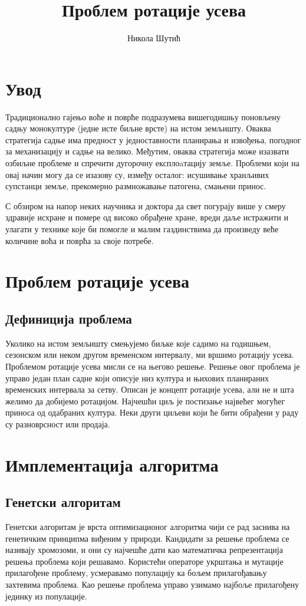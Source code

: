 \documentclass[12pt,fleqn]{article}
\title{Проблем ротације усева}
\author{Никола Шутић}
\affil{Математички факултет, Универзитет у Београду}
\begin{document}
\maketitle
\newpage

\tableofcontents
\newpage

\section{Увод}
Традиционално гајењо воће и поврће подразумева вишегодишњу поновљену садњу монокултуре (једне исте биљне врсте) на истом земљишту. Оваква стратегија садње има предност у једноставности планирања и извођења, погодног за механизацију и садње на велико. Међутим, оваква стратегија може изазвати озбиљне проблеме и спречити дугорочну експлоaтацију земље. Проблеми који на овај начин могу да се изазову су, између осталог: исушивање хранљивих супстанци земље, прекомерно размножавање патогена, смањени принос.

С обзиром на напор неких научника и доктора да свет погурају више у смеру здравије исхране и помере од високо обрађене хране, вреди даље истражити и улагати у технике које би помогле и малим газдинствима да произведу веће количине воћа и поврћа за своје потребе.

\section{Проблем ротације усева}
\subsection{Дефиниција проблема}
Уколико на истом земљишту смењујемо биљке које садимо на годишњем, сезонском или неком другом временском интервалу, ми вршимо ротацију усева. Проблемом ротације усева мисли се на његово решење. Решење овог проблема је управо један план садне који описује низ култура и њихових планираних временских интервала за сетву. Описан је концепт ротације усева, али не и шта желимо да добијемо ротацијом. Најчешћи циљ је постизање највећег могућег приноса од одабраних култура. Неки други циљеви који ће бити обрађени у раду су разноврсност или продаја.

\section{Имплементација алгоритма}
\subsection{Генетски алгоритам}
Генетски алгоритам је врста оптимизационог алгоритма чији се рад заснива на генетичким принципма виђеним у природи. Кандидати за решење проблема се називају хромозоми, и они су најчешће дати као математичка репрезентација решења проблема који решавамо. Користећи операторе укрштања и мутације прилагођене проблему, усмеравамо популацију ка бољем прилагођавању захтевима проблема. Као решење проблема управо узимамо најбоље прилагођену јединку из популације.
\end{document}
